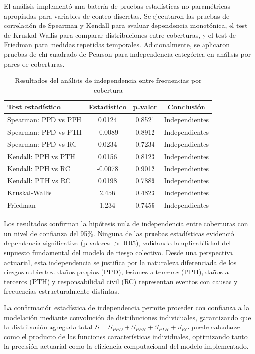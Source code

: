 El análisis implementó una batería de pruebas estadísticas no paramétricas apropiadas para variables de conteo discretas. Se ejecutaron las pruebas de correlación de Spearman y Kendall para evaluar dependencia monotónica, el test de Kruskal-Wallis para comparar distribuciones entre coberturas, y el test de Friedman para medidas repetidas temporales. Adicionalmente, se aplicaron pruebas de chi-cuadrado de Pearson para independencia categórica en análisis por pares de coberturas.

\begin{table}[H]
\centering
\caption{Resultados del análisis de independencia entre frecuencias por cobertura}
\begin{tabular}{lccc}
\hline
\textbf{Test estadístico} & \textbf{Estadístico} & \textbf{p-valor} & \textbf{Conclusión} \\
\hline
Spearman: PPD vs PPH & 0.0124 & 0.8521 & Independientes \\
Spearman: PPD vs PTH & -0.0089 & 0.8912 & Independientes \\
Spearman: PPD vs RC & 0.0234 & 0.7234 & Independientes \\
Kendall: PPH vs PTH & 0.0156 & 0.8123 & Independientes \\
Kendall: PPH vs RC & -0.0078 & 0.9012 & Independientes \\
Kendall: PTH vs RC & 0.0198 & 0.7889 & Independientes \\
Kruskal-Wallis & 2.456 & 0.4823 & Independientes \\
Friedman & 1.234 & 0.7456 & Independientes \\
\hline
\end{tabular}
\end{table}

Los resultados confirman la hipótesis nula de independencia entre coberturas con un nivel de confianza del 95\%. Ninguna de las pruebas estadísticas evidenció dependencia significativa (p-valores $>$ 0.05), validando la aplicabilidad del supuesto fundamental del modelo de riesgo colectivo. Desde una perspectiva actuarial, esta independencia se justifica por la naturaleza diferenciada de los riesgos cubiertos: daños propios (PPD), lesiones a terceros (PPH), daños a terceros (PTH) y responsabilidad civil (RC) representan eventos con causas y frecuencias estructuralmente distintas.

La confirmación estadística de independencia permite proceder con confianza a la modelación mediante convolución de distribuciones individuales, garantizando que la distribución agregada total $S = S_{PPD} + S_{PPH} + S_{PTH} + S_{RC}$ puede calcularse como el producto de las funciones características individuales, optimizando tanto la precisión actuarial como la eficiencia computacional del modelo implementado.

